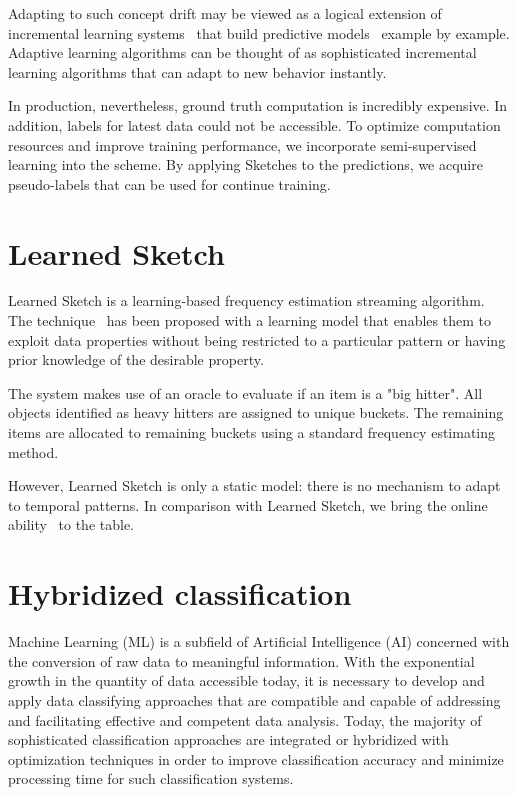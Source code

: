 Adapting to such concept drift may be viewed as a logical extension of incremental learning systems~\cite{gepperth2016incremental} that build predictive models~\cite{candanedo2018machine} example by example. Adaptive learning algorithms can be thought of as sophisticated incremental learning algorithms that can adapt to new behavior instantly.

In production, nevertheless, ground truth computation is incredibly expensive. In addition, labels for latest data could not be accessible. To optimize computation resources and improve training performance, we incorporate semi-supervised learning into the scheme. By applying Sketches to the predictions, we acquire pseudo-labels that can be used for continue training.

\section{Learned Sketch}

Learned Sketch is a learning-based frequency estimation streaming algorithm. The technique~\cite{hsu2019learning} has been proposed with a learning model that enables them to exploit data properties without being restricted to a particular pattern or having prior knowledge of the desirable property. 

The system makes use of an oracle to evaluate if an item is a "big hitter". All objects identified as heavy hitters are assigned to unique buckets. The remaining items are allocated to remaining buckets using a standard frequency estimating method. 

However, Learned Sketch is only a static model: there is no mechanism to adapt to temporal patterns. In comparison with Learned Sketch, we bring the online ability~\cite{benczur2018online} to the table. 


\section{Hybridized classification}

Machine Learning (ML) is a subfield of Artificial Intelligence (AI) concerned with the conversion of raw data to meaningful information. With the exponential growth in the quantity of data accessible today, it is necessary to develop and apply data classifying approaches that are compatible and capable of addressing and facilitating effective and competent data analysis. Today, the majority of sophisticated classification approaches are integrated or hybridized with optimization techniques in order to improve classification accuracy and minimize processing time for such classification systems. 

